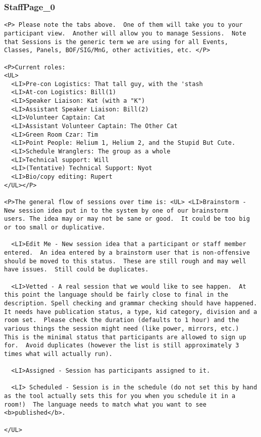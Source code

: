 \documentclass[captions=tablesignature]{scrartcl}
\begin{document}
\subsubsection{StaffPage\_0}
\label{sec-3-7-4}
\begin{verbatim}
<P> Please note the tabs above.  One of them will take you to your
participant view.  Another will allow you to manage Sessions.  Note
that Sessions is the generic term we are using for all Events,
Classes, Panels, BOF/SIG/MnG, other activities, etc. </P>

<P>Current roles:
<UL>
  <LI>Pre-con Logistics: That tall guy, with the 'stash
  <LI>At-con Logistics: Bill(1)
  <LI>Speaker Liaison: Kat (with a "K")
  <LI>Assistant Speaker Liaison: Bill(2)
  <LI>Volunteer Captain: Cat
  <LI>Assistant Volunteer Captain: The Other Cat
  <LI>Green Room Czar: Tim
  <LI>Point People: Helium 1, Helium 2, and the Stupid But Cute.
  <LI>Schedule Wranglers: The group as a whole
  <LI>Technical support: Will
  <LI>(Tentative) Technical Support: Nyot
  <LI>Bio/copy editing: Rupert
</UL></P>

<P>The general flow of sessions over time is: <UL> <LI>Brainstorm -
New session idea put in to the system by one of our brainstorm
users. The idea may or may not be sane or good.  It could be too big
or too small or duplicative.

  <LI>Edit Me - New session idea that a participant or staff member
entered.  An idea entered by a brainstorm user that is non-offensive
should be moved to this status.  These are still rough and may well
have issues.  Still could be duplicates.

  <LI>Vetted - A real session that we would like to see happen.  At
this point the language should be fairly close to final in the
description. Spell checking and grammar checking should have happened.
It needs have publication status, a type, kid category, division and a
room set.  Please check the duration (defaults to 1 hour) and the
various things the session might need (like power, mirrors, etc.)
This is the minimal status that participants are allowed to sign up
for.  Avoid duplicates (however the list is still approximately 3
times what will actually run).

  <LI>Assigned - Session has participants assigned to it.

  <LI> Scheduled - Session is in the schedule (do not set this by hand
as the tool actually sets this for you when you schedule it in a
room!)  The language needs to match what you want to see
<b>published</b>.

</UL>
\end{verbatim}
\end{document}
